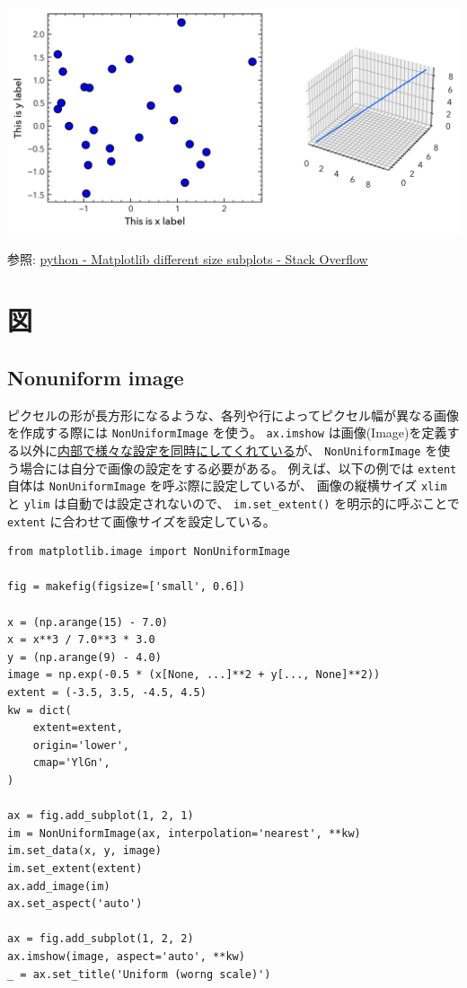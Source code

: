 \documentclass[a4paper, 10pt, notitlepage, twocolumn, uplatex, oneside, dvipdfmx]{jsarticle}
\begin{document}
\begin{center}
\includegraphics[width=1.0\linewidth]{./obipy-resources/params_grids.png}
\end{center}

参照: \href{https://stackoverflow.com/questions/10388462/matplotlib-different-size-subplots}{python - Matplotlib different size subplots - Stack Overflow}
\section{図}
\label{sec:org38da2c8}
\subsection{Nonuniform image}
\label{sec:org55dbc1e}
ピクセルの形が長方形になるような、各列や行によってピクセル幅が異なる画像を作成する際には
\texttt{NonUniformImage} を使う。
\texttt{ax.imshow} は画像(Image)を定義する以外に\href{https://github.com/matplotlib/matplotlib/blob/v3.10.5/lib/matplotlib/axes/\_axes.py\#L5750-L5996}{内部で様々な設定を同時にしてくれている}が、
\texttt{NonUniformImage} を使う場合には自分で画像の設定をする必要がある。
例えば、以下の例では \texttt{extent} 自体は \texttt{NonUniformImage} を呼ぶ際に設定しているが、
画像の縦横サイズ \texttt{xlim} と \texttt{ylim} は自動では設定されないので、
 \texttt{im.set\_extent()} を明示的に呼ぶことで \texttt{extent} に合わせて画像サイズを設定している。

\begin{verbatim}
from matplotlib.image import NonUniformImage

fig = makefig(figsize=['small', 0.6])

x = (np.arange(15) - 7.0)
x = x**3 / 7.0**3 * 3.0
y = (np.arange(9) - 4.0)
image = np.exp(-0.5 * (x[None, ...]**2 + y[..., None]**2))
extent = (-3.5, 3.5, -4.5, 4.5)
kw = dict(
    extent=extent,
    origin='lower',
    cmap='YlGn',
)

ax = fig.add_subplot(1, 2, 1)
im = NonUniformImage(ax, interpolation='nearest', **kw)
im.set_data(x, y, image)
im.set_extent(extent)
ax.add_image(im)
ax.set_aspect('auto')

ax = fig.add_subplot(1, 2, 2)
ax.imshow(image, aspect='auto', **kw)
_ = ax.set_title('Uniform (worng scale)')
\end{verbatim}
\end{document}
